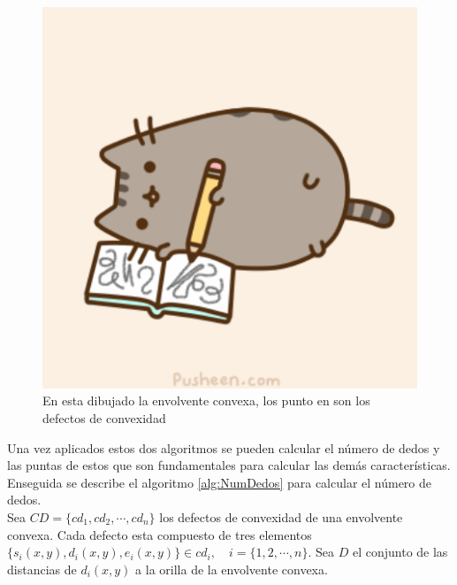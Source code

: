 \begin{figure}[!h]
\begin{center}
\includegraphics[scale=.5]{./Figures/pusheen.png}
\end{center}
\caption{En esta dibujado la envolvente convexa, los punto en son los defectos de convexidad}
\label{fig:Convex&Defects}
\end{figure}


Una vez aplicados estos dos algoritmos se pueden calcular el número de dedos y las puntas de estos que son fundamentales para calcular las demás características. Enseguida se describe el algoritmo \ref{alg:NumDedos} para calcular el número de dedos.\\ 
Sea $CD=\lbrace cd_1, cd_2, \cdots, cd_n \rbrace$ los defectos de convexidad de una envolvente convexa. Cada defecto esta compuesto de tres elementos $\lbrace s_i(x,y),d_i(x,y),e_i(x,y) \rbrace \in cd_i, \quad i=\lbrace 1, 2, \cdots, n\rbrace$. Sea $D$ el conjunto de las distancias de $d_i(x,y)$ a la orilla de la envolvente convexa.  


